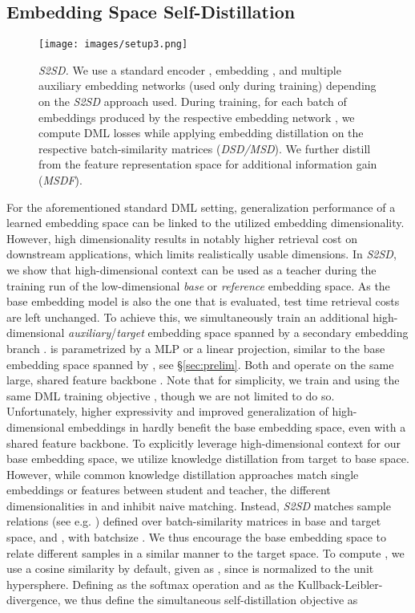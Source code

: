 \documentclass{article} \usepackage{arxiv_style,times}
\begin{document}
\subsection{Embedding Space Self-Distillation}\label{sec:dual}
\begin{figure*}[t]
    \centering
    \texttt{[image: images/setup3.png]}
    \caption{\textit{S2SD.} We use a standard encoder , embedding , and multiple auxiliary embedding networks  (used only during training) depending on the \textit{S2SD} approach used. 
    During training, for each batch of embeddings produced by the respective embedding network , we compute DML losses while applying embedding distillation on the respective batch-similarity matrices (\textit{DSD/MSD}). We further distill from the feature representation space for additional information gain (\textit{MSDF}).}
    \label{fig:setup}
\end{figure*} For the aforementioned standard DML setting, generalization performance of a learned embedding space can be linked to the utilized embedding dimensionality. However, high dimensionality results in notably higher retrieval cost on downstream applications, which limits realistically usable dimensions.
In \textit{S2SD}, we show that high-dimensional context can be used as a teacher during the training run of the low-dimensional \textit{base} or \textit{reference} embedding space. As the base embedding model is also the one that is evaluated, test time retrieval costs are left unchanged.
To achieve this, we simultaneously train an additional high-dimensional \textit{auxiliary}/\textit{target} embedding space  spanned by a secondary embedding branch .  is parametrized by a MLP or a linear projection, similar to the base embedding space  spanned by , see \S\ref{sec:prelim}. Both  and  operate on the same large, shared feature backbone .
Note that for simplicity, we train  and  using the same DML training objective , though we are not limited to do so.\\ 
Unfortunately, higher expressivity and improved generalization of high-dimensional embeddings in  hardly benefit the base embedding space, even with a shared feature backbone. To explicitly leverage high-dimensional context for our base embedding space, we utilize knowledge distillation from target to base space.
However, while common knowledge distillation approaches match single embeddings or features between student and teacher, the different dimensionalities in  and  inhibit naive matching. Instead, \textit{S2SD} matches sample relations (see e.g. \cite{tian2019contrastive}) defined over batch-similarity matrices  in base and target space,  and , with batchsize . We thus encourage the base embedding space to relate different samples in a similar manner to the target space. 
To compute , we use a cosine similarity by default, given as , since  is normalized to the unit hypersphere. Defining  as the softmax operation and  as the Kullback-Leibler-divergence, we thus define the simultaneous self-distillation objective as
\end{document}
